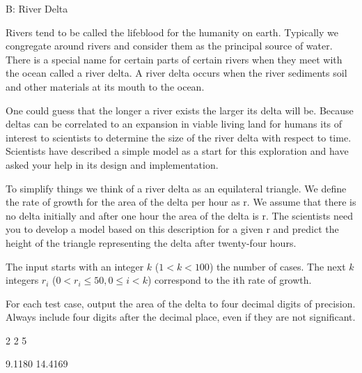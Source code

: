\begin{problem}{B: River Delta}

Rivers tend to be called the lifeblood for the humanity on earth.
Typically we congregate around rivers and consider them as the principal source of water.
There is a special name for certain parts of certain rivers when they meet with the ocean called a river delta.
A river delta occurs when the river sediments soil and other materials at its mouth to the ocean.

One could guess that the longer a river exists the larger its delta will be.
Because deltas can be correlated to an expansion in viable living land for humans its of interest to scientists to determine the size of the river delta with respect to time.
Scientists have described a simple model as a start for this exploration and have asked your help in its design and implementation.

To simplify things we think of a river delta as an equilateral triangle.
We define the rate of growth for the area of the delta per hour as r.
We assume that there is no delta initially and after one hour the area of the delta is r.
The scientists need you to develop a model based on this description for a given r and predict the height of the triangle representing the delta after twenty-four hours.
\end{problem}

\begin{formalin}
The input starts with an integer $k$ ($1 < k < 100$) the number of cases.
The next $k$ integers $r_i$ ($0 < r_i \leq 50, 0 \leq i < k$) correspond to the ith rate of growth.
\end{formalin}

\begin{formalout}
For each test case, output the area of the delta to four decimal digits of precision.
Always include four digits after the decimal place, even if they are not significant.
\end{formalout}

\begin{datain}
2
2
5
\end{datain}

\begin{dataout}
9.1180
14.4169
\end{dataout}

